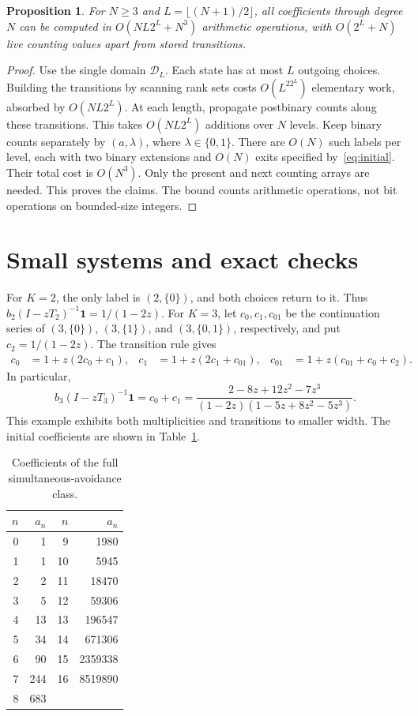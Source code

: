 \documentclass[11pt]{article}
\newtheorem{proposition}[theorem]{Proposition}
\theoremstyle{remark}
\newcommand{\D}{\mathcal D}
\newcommand{\one}{\mathbf 1}
\begin{document}
\begin{proposition}\label{prop:cost}
For $N\geq3$ and $L=\lfloor(N+1)/2\rfloor$, all coefficients through
degree $N$ can be computed in $O(NL2^L+N^3)$ arithmetic operations, with
$O(2^L+N)$ live counting values apart from stored transitions.
\end{proposition}

\begin{proof}
Use the single domain $\D_L$. Each state has at most $L$ outgoing
choices. Building the transitions by scanning rank sets costs
$O(L^22^L)$ elementary work, absorbed by $O(NL2^L)$.
At each length, propagate postbinary counts along these transitions.
This takes $O(NL2^L)$ additions over $N$ levels.
Keep binary counts separately by $(a,\lambda)$, where
$\lambda\in\{0,1\}$. There are $O(N)$ such labels per level, each with
two binary extensions and $O(N)$ exits specified by~\eqref{eq:initial}.
Their total cost is $O(N^3)$. Only the present and next counting arrays
are needed. This proves the claims. The bound counts arithmetic
operations, not bit operations on bounded-size integers.
\end{proof}

\section{Small systems and exact checks}

For $K=2$, the only label is $(2,\{0\})$, and both choices return to it.
Thus $b_2(I-zT_2)^{-1}\one=1/(1-2z)$.
For $K=3$, let $c_0,c_1,c_{01}$ be the continuation series of
$(3,\{0\})$, $(3,\{1\})$, and $(3,\{0,1\})$, respectively, and put
$c_2=1/(1-2z)$. The transition rule gives
\begin{align*}
 c_0&=1+z(2c_0+c_1),&
 c_1&=1+z(2c_1+c_{01}),&
 c_{01}&=1+z(c_{01}+c_0+c_2).
\end{align*}
In particular,
\[
 b_3(I-zT_3)^{-1}\one=c_0+c_1
 =\frac{2-8z+12z^2-7z^3}{(1-2z)(1-5z+8z^2-5z^3)}.
\]
This example exhibits both multiplicities and transitions to smaller width.
The initial coefficients are shown in Table~\ref{tab:counts}.

\begin{table}[ht]
\centering
\begin{tabular}{r r@{\qquad}r r}
\toprule
$n$&$a_n$&$n$&$a_n$\\
\midrule
0&1&9&1980\\
1&1&10&5945\\
2&2&11&18470\\
3&5&12&59306\\
4&13&13&196547\\
5&34&14&671306\\
6&90&15&2359338\\
7&244&16&8519890\\
8&683&&\\
\bottomrule
\end{tabular}
\caption{Coefficients of the full simultaneous-avoidance class.}
\label{tab:counts}
\end{table}
\end{document}
